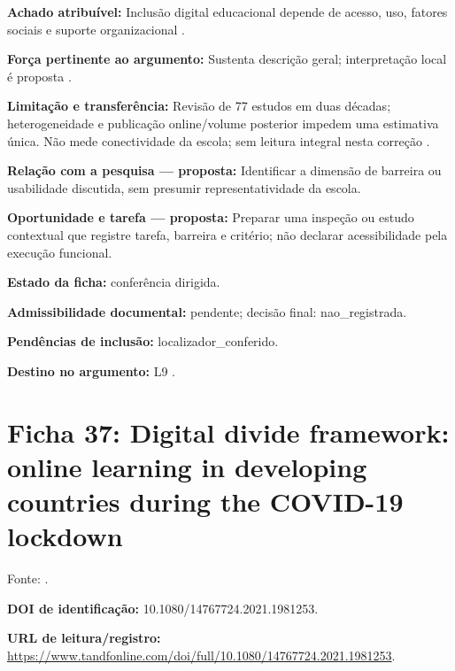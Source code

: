\noindent\textbf{Achado atribuível:} Inclusão digital educacional depende de acesso, uso, fatores sociais e suporte organizacional \citep{martin2024}.\par\medskip

\noindent\textbf{Força pertinente ao argumento:} Sustenta descrição geral; interpretação local é proposta \citep{martin2024}.\par\medskip

\noindent\textbf{Limitação e transferência:} Revisão de 77 estudos em duas décadas; heterogeneidade e publicação online/volume posterior impedem uma estimativa única. Não mede conectividade da escola; sem leitura integral nesta correção \citep{martin2024}.\par\medskip

\noindent\textbf{Relação com a pesquisa — proposta:} Identificar a dimensão de barreira ou usabilidade discutida, sem presumir representatividade da escola.\par\medskip

\noindent\textbf{Oportunidade e tarefa — proposta:} Preparar uma inspeção ou estudo contextual que registre tarefa, barreira e critério; não declarar acessibilidade pela execução funcional.\par\medskip

\noindent\textbf{Estado da ficha:} conferência dirigida.\par\medskip

\noindent\textbf{Admissibilidade documental:} pendente; decisão final: nao\_registrada.\par\medskip

\noindent\textbf{Pendências de inclusão:} localizador\_conferido.\par\medskip

\noindent\textbf{Destino no argumento:} L9 .

\clearpage\section*{Ficha 37: Digital divide framework: online learning in developing countries during the COVID-19 lockdown}

Fonte: \citet{mathrani2021}.

\noindent\textbf{DOI de identificação:} 10.1080/14767724.2021.1981253.\par\medskip

\noindent\textbf{URL de leitura/registro:} \url{https://www.tandfonline.com/doi/full/10.1080/14767724.2021.1981253}.\par\medskip


